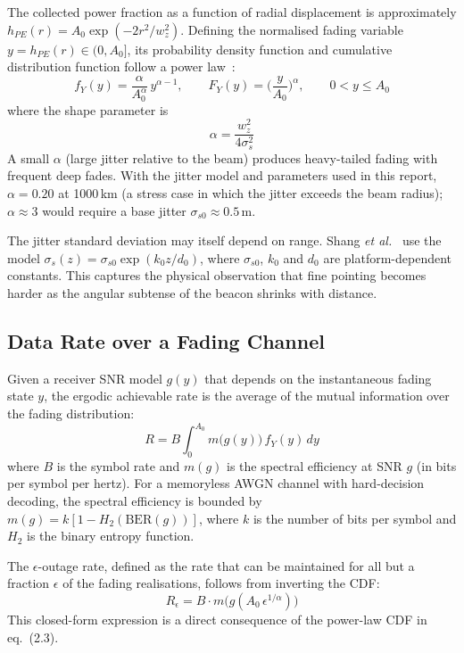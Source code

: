 The collected power fraction as a function of radial displacement is approximately $h_{PE}(r)=A_0\exp(-2r^2/w_z^2)$. Defining the normalised fading variable $y=h_{PE}(r)\in(0,A_0]$, its probability density function and cumulative distribution function follow a power law~\cite{shang2025}:
\begin{equation}
f_Y(y)=\frac{\alpha}{A_0^\alpha}\,y^{\alpha-1},\qquad F_Y(y)=\Big(\frac{y}{A_0}\Big)^\alpha,\qquad 0<y\le A_0
\end{equation}
where the shape parameter is
\begin{equation}
\alpha=\frac{w_z^2}{4\sigma_s^2}
\end{equation}
A small $\alpha$ (large jitter relative to the beam) produces heavy-tailed fading with frequent deep fades. With the jitter model and parameters used in this report, $\alpha=0.20$ at 1000\,km (a stress case in which the jitter exceeds the beam radius); $\alpha\approx3$ would require a base jitter $\sigma_{s0}\approx0.5$\,m.

The jitter standard deviation may itself depend on range. Shang \emph{et al.}~\cite{shang2025} use the model $\sigma_s(z)=\sigma_{s0}\exp(k_0z/d_0)$, where $\sigma_{s0}$, $k_0$ and $d_0$ are platform-dependent constants. This captures the physical observation that fine pointing becomes harder as the angular subtense of the beacon shrinks with distance.

\subsection{Data Rate over a Fading Channel}

Given a receiver SNR model $g(y)$ that depends on the instantaneous fading state $y$, the ergodic achievable rate is the average of the mutual information over the fading distribution:
\begin{equation}
R=B\int_0^{A_0}m\big(g(y)\big)\,f_Y(y)\,dy
\end{equation}
where $B$ is the symbol rate and $m(g)$ is the spectral efficiency at SNR $g$ (in bits per symbol per hertz). For a memoryless AWGN channel with hard-decision decoding, the spectral efficiency is bounded by $m(g)=k[1-H_2(\mathrm{BER}(g))]$, where $k$ is the number of bits per symbol and $H_2$ is the binary entropy function.

The $\epsilon$-outage rate, defined as the rate that can be maintained for all but a fraction $\epsilon$ of the fading realisations, follows from inverting the CDF:
\begin{equation}
R_\epsilon=B\cdot m\!\big(g(A_0\,\epsilon^{1/\alpha})\big)
\end{equation}
This closed-form expression is a direct consequence of the power-law CDF in eq.~(2.3).


